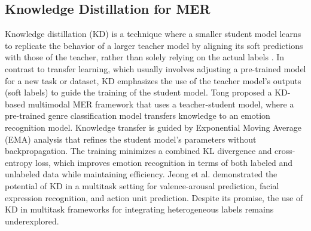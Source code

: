 \subsection{Knowledge Distillation for MER}
Knowledge distillation (KD) is a technique where a smaller student model learns to replicate the behavior of a larger teacher model by aligning its soft predictions with those of the teacher, rather than solely relying on the actual labels \cite{hinton2015distilling}. In contrast to transfer learning, which usually involves adjusting a pre-trained model for a new task or dataset, KD emphasizes the use of the teacher model's outputs (soft labels) to guide the training of the student model.
Tong \cite{tong2022multimodal} proposed a KD-based multimodal MER framework that uses a teacher-student model, where a pre-trained genre classification model transfers knowledge to an emotion recognition model. Knowledge transfer is guided by Exponential Moving Average (EMA) analysis that refines the student model’s parameters without backpropagation. The training minimizes a combined KL divergence and cross-entropy loss, which improves emotion recognition in terms of both labeled and unlabeled data while maintaining efficiency. 
Jeong et al. \cite{jeong2022multitask} demonstrated the potential of KD in a multitask setting for valence-arousal prediction, facial expression recognition, and action unit prediction. Despite its promise, the use of KD in multitask frameworks for integrating heterogeneous labels remains underexplored.

